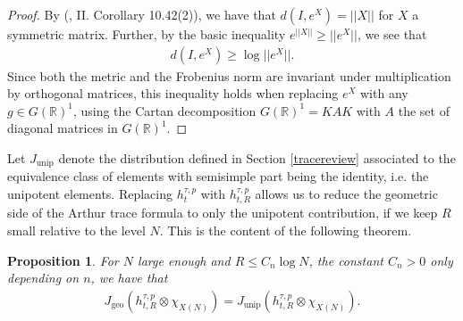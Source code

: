 \documentclass[11pt,reqno]{amsart}
\numberwithin{equation}{section}
\newtheorem{prop}[thm]{Proposition}
\theoremstyle{definition}
\theoremstyle{remark}
\newcommand{\unip}{\operatorname{unip}}
\newcommand{\geo}{\operatorname{geo}}
\newcommand{\R}{\mathbb{R}}
\begin{document}
\begin{proof}
    By (\cite{bridsonhaefliger}, II. Corollary 10.42(2)), we have that $d(I,e^X) = ||X||$ for $X$ a symmetric matrix. Further, by the basic inequality $e^{||X||}\geq ||e^X||$, we see that
\begin{align*}
    d(I,e^X)\geq \log||e^X||.
\end{align*}
Since both the metric and the Frobenius norm are invariant under multiplication by orthogonal matrices, this inequality holds when replacing $e^X$ with any $g\in G(\R)^1$, using the Cartan decomposition $G(\R)^1=KAK$ with $A$ the set of diagonal matrices in $G(\R)^1$.
\end{proof}

\noindent Let $J_{\unip}$ denote the distribution defined in Section \ref{tracereview} associated to the equivalence class of elements with semisimple part being the identity, i.e. the unipotent elements. Replacing $h_t^{\tau,p}$ with $h_{t,R}^{\tau,p}$ allows us to reduce the geometric side of the Arthur trace formula to only the unipotent contribution, if we keep $R$ small relative to the level $N$. This is the content of the following theorem.

\begin{prop}\label{compactunip}
    For $N$ large enough and $R\leq C_n\log N$, the constant $C_n>0$ only depending on $n$, we have that
    \begin{align*}
        J_{\geo}(h_{t,R}^{\tau,p}\otimes\chi_{{X(N)}}) = J_{\unip}(h_{t,R}^{\tau,p}\otimes\chi_{{X(N)}}).
    \end{align*}
\end{prop}
\end{document}
